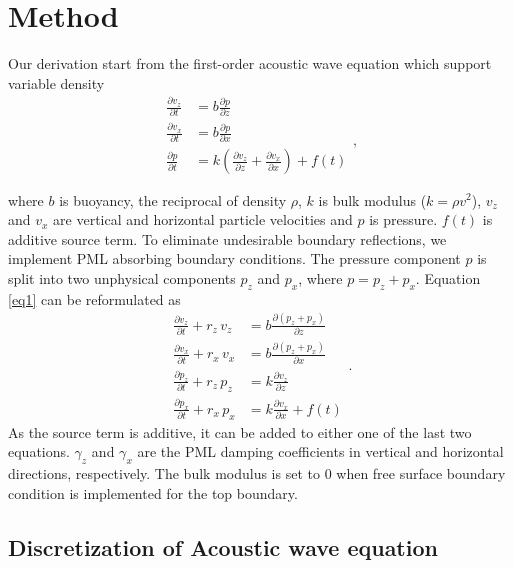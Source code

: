 \documentclass[revised,endfloat]{geophysics}
\begin{document}
\section{Method}
Our derivation start from the first-order acoustic wave equation which support variable density
\begin{equation}
\begin{split}
\frac{\partial v_z}{\partial t} &= b \frac{\partial p}{\partial z}   \\
\frac{\partial v_x}{\partial t} &= b \frac{\partial p}{\partial x} \\
\frac{\partial p}{\partial t} &= k(\frac{\partial v_z}{\partial z} + \frac{\partial v_x}{\partial x}) + f(t)\\
 \\
\end{split}, 
\label{eq1}
\end{equation}
where $b$ is buoyancy, the reciprocal of density $\rho$, $k$ is bulk modulus ($k = \rho v^2$), $v_z$ and $v_x$ are vertical and horizontal particle velocities and $p$ is pressure. $f(t)$ is additive source term. To eliminate undesirable boundary reflections, we implement PML absorbing boundary conditions. The pressure component $p$ is split into two unphysical components $p_z$ and $p_x$, where $p = p_z + p_x$. Equation \ref{eq1} can be reformulated as
\begin{equation}
\begin{split}
\frac{\partial v_z}{\partial t} + r_z\, v_z &= b \frac{\partial \left( p_z + p_x \right) }{\partial z}   \\
\frac{\partial v_x}{\partial t} + r_x\, v_x &= b \frac{\partial \left( p_z + p_x \right) }{\partial x}   \\
\frac{\partial p_z}{\partial t} + r_z\, p_z &= k \frac{\partial v_z}{\partial z} \\
\frac{\partial p_x}{\partial t} + r_x\, p_x &= k \frac{\partial v_x}{\partial x} + f(t)
\end{split}.  
\label{eq2}
\end{equation}
As the source term is additive, it can be added to either one of the last two equations. $\gamma_z$ and $\gamma_x$ are the PML damping coefficients in vertical and horizontal directions, respectively. The bulk modulus is set to $0$ when free surface boundary condition is implemented for the top boundary.

\subsection{Discretization of Acoustic wave equation}
\end{document}
